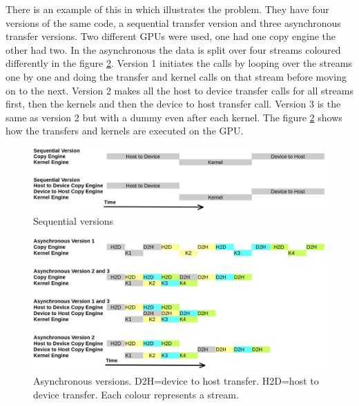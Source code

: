 \documentclass[10pt,a4paper]{report}
\newcounter{example}
\begin{document}
\newpage
There is an example of this in \cite{cuda_fortran_overlap} which illustrates the problem. They have four versions of the same code, a sequential transfer version and three asynchronous transfer versions. Two different GPUs were used, one had one copy engine the other had two. In the asynchronous the data is split over four streams coloured differently in the figure \ref{fig:ascynchronous}. Version 1 initiates the calls by looping over the streams one by one and doing the transfer and kernel calls on that stream before moving on to the next\cite{cuda_fortran_overlap}. Version 2 makes all the host to device transfer calls for all streams first, then the kernels and then the device to host transfer call\cite{cuda_fortran_overlap}. Version 3 is the same as version 2 but with a dummy even after each kernel\cite{cuda_fortran_overlap}. The figure \ref{fig:ascynchronous} shows how the transfers and kernels are executed on the GPU.

\begin{figure}[h]
    \centering
    \includegraphics[width=12cm]{streams_seq.jpg}
    \caption{Sequential versions}
    \label{fig:sequential}
\end{figure}

\begin{figure}[h]
    \centering
    \includegraphics[width=12cm]{streams_async.jpg}
    \caption{Asynchronous versions. D2H=device to host transfer. H2D=host to device transfer. Each colour represents a stream.}
    \label{fig:ascynchronous}
\end{figure}

\newpage
\end{document}
